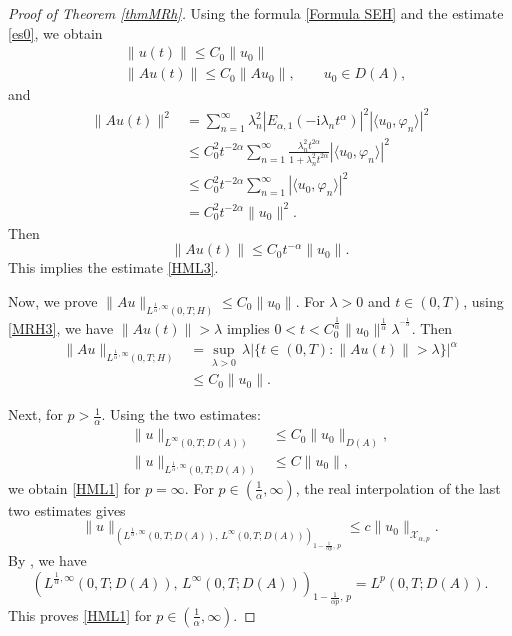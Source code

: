 \documentclass[reqno]{amsart}
\numberwithin{equation}{section}
\begin{document}
\begin{proof}[Proof of Theorem \ref{thmMRh}]
Using the formula \eqref{Formula SEH} and the estimate \eqref{es0}, we obtain
\begin{align*}
	&\|u(t)\|\leq C_0 \|u_0\| \\
	&\|Au(t)\|\leq C_0 \|Au_0\|, \qquad u_0\in D(A),
\end{align*}
and
\begin{align*}
	\|Au(t)\|^2 &= \sum_{n=1}^\infty \lambda_n^2 |E_{\alpha, 1}\left(-\mathrm{i} \lambda_n t^\alpha\right)|^2 |\langle u_0,\varphi_n\rangle|^2\\
	&\le C_0^2 t^{-2\alpha} \sum_{n=1}^\infty\frac{\lambda_n^2 t^{2\alpha}}{1+\lambda_n^2 t^{2\alpha}}|\langle u_0,\varphi_n\rangle|^2\\
	&\le C_0^2 t^{-2\alpha} \sum_{n=1}^\infty|\langle u_0,\varphi_n\rangle|^2\\
	& =C_0^2 t^{-2\alpha}\|u_0\|^2.
\end{align*}
Then
\begin{equation}\label{MRH3}
	\|Au(t)\|\le C_0 t^{-\alpha}\|u_0\|.
\end{equation}
This implies the estimate \eqref{HML3}.

Now, we prove $\|Au\|_{L^{\frac{1}{\alpha},\infty}(0,T;H)}
\le C_0 \|u_0\|$. For $\lambda>0$ and $t\in (0,T)$, using \eqref{MRH3}, we have $\|Au(t)\|>\lambda$ implies $0<t< C_0^{\frac{1}{\alpha}} \|u_0\|^{\frac{1}{\alpha}}\lambda^{^{-\frac{1}{\alpha}}}.$ Then
\begin{align*}
	\|Au\|_{L^{\frac{1}{\alpha},\infty}(0,T;H)}&=\sup_{\lambda>0} \, \lambda\Big|\Big\{ t\in (0,T)\colon \|Au(t)\|>\lambda \Big\}\Big|^{\alpha}\\
	&\leq C_0\|u_0\|. 
\end{align*}

Next, for $p>\frac{1}{\alpha}$. Using the two estimates:
\begin{align*}
	\|u\|_{L^{\infty}(0,T;D(A))}&\leq C_0\|u_0\|_{D(A)},\\
	\|u\|_{L^{\frac{1}{\alpha},\infty}(0,T;D(A))}&\leq C \|u_0\|,
\end{align*}
we obtain \eqref{HML1} for $p=\infty$. For $p\in (\frac{1}{\alpha},\infty)$, the real interpolation of the last two estimates gives
\[
\|u\|_{\left(L^{\frac{1}{\alpha},\infty}(0,T;D(A)),\,L^\infty(0,T;D(A))\right)_{1-\frac{1}{\alpha p},\,p}}
\le c \|u_0\|_{\mathcal{X}_{\alpha,p}}.
\]
By \cite[Theorem~2, \S 1.18.6]{Tr78}, we have
\[
\left(L^{\frac{1}{\alpha},\infty}(0,T;D(A)),\,L^\infty(0,T;D(A))\right)_{1-\frac{1}{\alpha p},\,p}
= L^p(0,T;D(A)).
\]
This proves \eqref{HML1} for $p\in\left(\tfrac1\alpha,\infty\right)$.
\end{proof}
\end{document}
